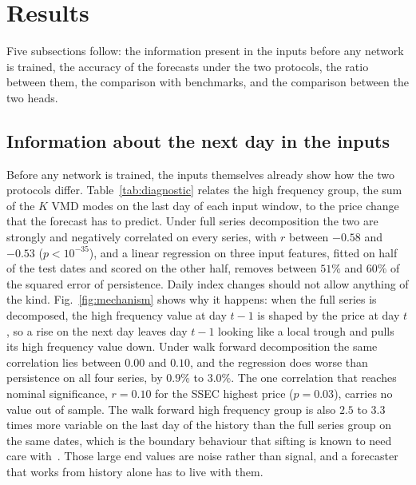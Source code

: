 \documentclass[pdflatex,sn-mathphys-num]{sn-jnl}%
\theoremstyle{thmstyleone}%
\theoremstyle{thmstyletwo}%
\theoremstyle{thmstylethree}%
\begin{document}
\section{Results}\label{sec:results}

Five subsections follow: the information present in the inputs before any
network is trained, the accuracy of the forecasts under the two protocols, the
ratio between them, the comparison with benchmarks, and the comparison between
the two heads.

\subsection{Information about the next day in the inputs}
Before any network is trained, the inputs themselves already show how the two
protocols differ. Table~\ref{tab:diagnostic} relates the high frequency group,
the sum of the $K$ VMD modes on the last day of each input window, to the price
change that the forecast has to predict. Under full series decomposition the
two are strongly and negatively correlated on every series, with $r$ between
$-0.58$ and $-0.53$ ($p<10^{-35}$), and a linear regression on three input
features, fitted on half of the test dates and scored on the other half,
removes between $51\%$ and $60\%$ of the squared error of persistence. Daily
index changes should not allow anything of the kind. Fig.~\ref{fig:mechanism}
shows why it happens: when the full series is decomposed, the high frequency
value at day $t-1$ is shaped by the price at day $t$, so a rise on the next day
leaves day $t-1$ looking like a local trough and pulls its high frequency value
down. Under walk forward decomposition the same correlation lies between
$0.00$ and $0.10$, and the regression does worse than persistence on all four
series, by $0.9\%$ to $3.0\%$. The one correlation that reaches nominal
significance, $r=0.10$ for the SSEC highest price ($p=0.03$), carries no value
out of sample. The walk forward high frequency group is also $2.5$ to $3.3$
times more variable on the last day of the history than the full series group
on the same dates, which is the boundary behaviour that sifting is known to
need care with~\cite{emdtutorial2023}. Those large end values are noise rather
than signal, and a forecaster that works from history alone has to live with
them.
\end{document}
